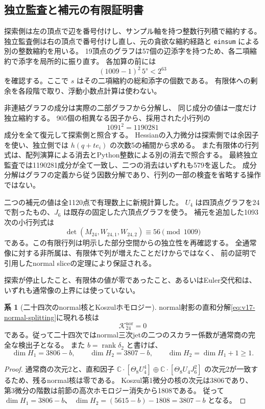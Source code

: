 \documentclass[a4paper,11pt]{ltjsarticle}
\theoremstyle{definition}
\newtheorem{corollary}[theorem]{系}
\begin{document}
\subsection{独立監査と補元の有限証明書}

探索側は左の頂点で辺を番号付けし、サンプル軸を持つ整数行列積で縮約する。
独立監査側は右の頂点で番号付けし直し、元の貪欲な縮約経路と
\texttt{einsum} による別の整数縮約を用いる。
19頂点のグラフは57個の辺添字を持つため、各二項縮約で添字を局所的に振り直す。
各加算の前には
\[
 (1009-1)^2\,5^s<2^{63}
\]
を確認する。ここで $s$ はその二項縮約の総和添字の個数である。
有限体への剰余を各段階で取り、浮動小数点計算は使わない。

非連結グラフの成分は実際の二部グラフから分解し、
同じ成分の値は一度だけ独立縮約する。
905個の相異なる因子から、採用された小行列の
\[
 1091^2=1190281
\]
成分を全て復元して探索側と照合する。
Hessianの入力微分は探索側では余因子を使い、独立側では
$h(q+te_i)$ の次数5の補間から求める。
また有限体の行列式は、配列演算による消去とPython整数による別の消去で照合する。
最終独立監査では1190281成分が全て一致し、二つの消去はいずれも579を返した。
成分分解はグラフの定義から従う因数分解であり、行列の一部の検査を省略する操作ではない。

二つの補元の値は全1120点で有理数上に新規計算した。
$U_4$ は四頂点グラフを24で割ったもの、$J_6$ は既存の固定した六頂点グラフを使う。
補元を追加した1093次の小行列式は
\[
 \det(M_{24},W_{24,1},W_{24,2})\equiv56\pmod{1009}
\]
である。この有限行列は明示した部分空間からの独立性を再確認する。
全通常像に対する非所属は、有限体で列が増えたことだけからではなく、
前の証明で引用したnormal sliceの定理により保証される。

探索が停止したこと、有限体の値が零であったこと、あるいはEuler交代和は、
いずれも通常像の上界には使っていない。

\begin{corollary}[二十四次のnormal核とKoszulホモロジー]
\label{cor:v17-rank24-normal-koszul}
normal射影の直和分解\eqref{eq:v17-normal-splitting}に現れる核は
\[
 \mathcal K_{24}^{\mathrm{nor}}=0
\]
である。従って二十四次ではnormal三次jetの二つのスカラー係数が通常商の完全な検出子となる。
また $b=\operatorname{rank}\delta_2$ と書けば、
\[
 \dim H_1=3806-b,\qquad
 \dim H_2=3807-b,\qquad
 \dim H_2=\dim H_1+1\ge1.
\]
\end{corollary}

\begin{proof}
通常商の次元2と、直和因子
$\mathbb C\cdot[\Theta_8U_4^4]\oplus\mathbb C\cdot[\Theta_8U_4J_6^2]$
の次元2が一致するため、残るnormal核は零である。
Koszul第1微分の核の次元は3806であり、
第3微分の階数は前節の高次ホモロジー消失から1808である。
従って $\dim H_1=3806-b$、
$\dim H_2=(5615-b)-1808=3807-b$ となる。
\end{proof}
\end{document}
